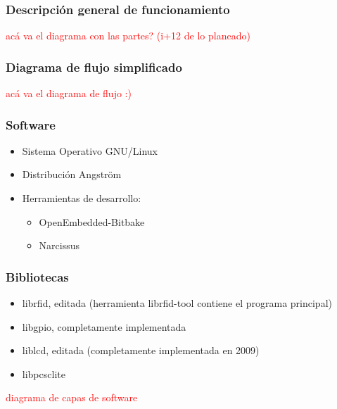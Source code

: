 \documentclass{beamer}
\begin{document}
\begin{frame}
	\frametitle{Descripción general de funcionamiento}
	\textcolor{red}{acá va el diagrama con las partes? (i+12 de lo planeado)}
\end{frame}	
	
\begin{frame}
	\frametitle{Diagrama de flujo simplificado}
	\textcolor{red}{acá va el diagrama de flujo :)}
\end{frame}		
	
\begin{frame}
	\frametitle{Software}
	\begin{itemize}
		\item Sistema Operativo GNU/Linux

		\bigskip
		\item Distribución Angström

		\bigskip
		\item Herramientas de desarrollo: 
		\begin{itemize} 
			\item OpenEmbedded-Bitbake 
			\item Narcissus 
		\end{itemize}
	\end{itemize}
\end{frame}		

\begin{frame}
	\frametitle{Bibliotecas}
	\begin{itemize}
		\item librfid, editada (herramienta librfid-tool contiene el programa principal)

		\bigskip
		\item libgpio, completamente implementada

		\bigskip
		\item liblcd, editada (completamente implementada en 2009)

		\bigskip
		\item libpcsclite
	\end{itemize}

\textcolor{red}{diagrama de capas de software}
\end{frame}
\end{document}
